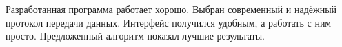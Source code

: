 Разработанная программа работает хорошо. %
Выбран современный и надёжный протокол передачи данных. %
Интерфейс получился удобным, а работать с ним просто. %
Предложенный алгоритм показал лучшие результаты. %
